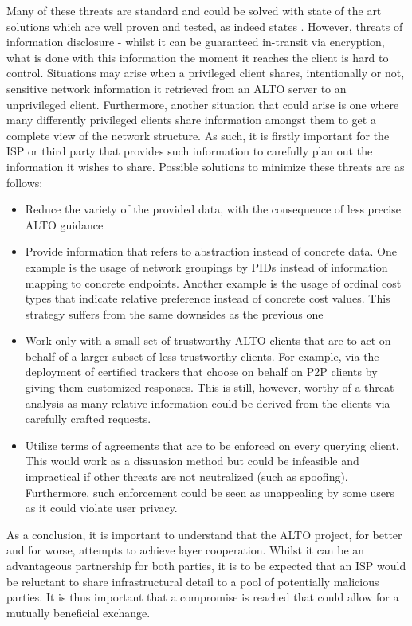     Many of these threats are standard and could be solved with state of the art solutions which are well proven and tested, as indeed states \cite{alto-protocol}.
    However, threats of information disclosure - whilst it can be guaranteed in-transit via encryption, what is done with this information the moment it reaches the client is hard to control.
    Situations may arise when a privileged client shares, intentionally or not, sensitive network information it retrieved from an ALTO server to an unprivileged client.
    Furthermore, another situation that could arise is one where many differently privileged clients share information amongst them to get a complete view of the network structure.
    As such, it is firstly important for the ISP or third party that provides such information to carefully plan out the information it wishes to share.
    Possible solutions to minimize these threats are as follows:

\begin{itemize}
    \item Reduce the variety of the provided data, with the consequence of less precise ALTO guidance
    \item Provide information that refers to abstraction instead of concrete data.
        One example is the usage of network groupings by PIDs instead of information mapping to concrete endpoints.
        Another example is the usage of ordinal cost types that indicate relative preference instead of concrete cost values.
        This strategy suffers from the same downsides as the previous one
    \item Work only with a small set of trustworthy ALTO clients that are to act on behalf of a larger subset of less trustworthy clients.
        For example, via the deployment of certified trackers that choose on behalf on P2P clients by giving them customized responses.
        This is still, however, worthy of a threat analysis as many relative information could be derived from the clients via carefully crafted requests.
    \item Utilize terms of agreements that are to be enforced on every querying client.
        This would work as a dissuasion method but could be infeasible and impractical if other threats are not neutralized (such as spoofing).
        Furthermore, such enforcement could be seen as unappealing by some users as it could violate user privacy.
\end{itemize}

    As a conclusion, it is important to understand that the ALTO project, for better and for worse, attempts to achieve layer cooperation.
    Whilst it can be an advantageous partnership for both parties, it is to be expected that an ISP would be reluctant to share infrastructural detail to a pool of potentially malicious parties.
    It is thus important that a compromise is reached that could allow for a mutually beneficial exchange.

